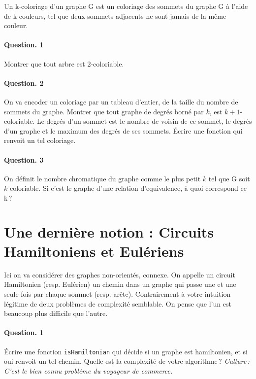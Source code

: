 \documentclass[10pt,a4paper]{article}
\begin{document}
Un k-coloriage d'un graphe G est un coloriage des sommets du graphe G à
l'aide de k couleurs, tel que deux sommets adjacents ne sont jamais de la
même couleur.

\paragraph{Question. 1\\}
Montrer que tout arbre est 2-coloriable.

\paragraph{Question. 2\\}
On va encoder un coloriage par un tableau d'entier, de la taille du
nombre de sommets du graphe. Montrer que tout graphe de degrés borné par
$k$, est $k+1$-coloriable. Le degrés d'un sommet est le nombre de voisin
de ce sommet, le degrés d'un graphe et le maximum des degrés de ses
sommets. Écrire une fonction qui renvoit un tel coloriage. 

\paragraph{Question. 3\\}
On définit le nombre chromatique du graphe comme le plus petit $k$ tel que
G soit $k$-coloriable. Si c'est le graphe d'une relation d'equivalence, à quoi
correspond ce k\,?

\section{Une dernière notion : Circuits Hamiltoniens et Eulériens}
Ici on va considérer des graphes non-orientés, connexe.
On appelle un circuit Hamiltonien (resp. Eulérien) un chemin dans un graphe qui passe une
et une seule fois par chaque sommet (resp. arête). Contrairement à votre
intuition légitime de deux problèmes de complexité semblable. On pense
que l'un est beaucoup plus difficile que l'autre. 

\paragraph{Question. 1\\} Écrire une fonction \texttt{isHamiltonian} qui
décide si un graphe est hamiltonien, et si oui renvoit un tel chemin.
Quelle est la complexité de votre algorithme\,? \emph{Culture\,: C'est le
bien connu problème du voyageur de commerce.}
\end{document}

